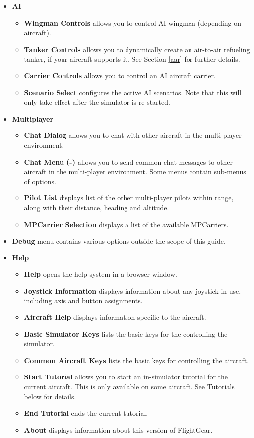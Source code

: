 \begin{itemize}
\item \textbf{AI}
 \begin{itemize}
  \item \textbf{Wingman Controls} allows you to control AI wingmen (depending on aircraft).
  \item \textbf{Tanker Controls}  allows you to dynamically create an air-to-air refueling
  tanker, if your aircraft supports it. See Section \ref{aar} for further details.
  \item \textbf{Carrier Controls} allows you to control an AI aircraft carrier.
  \item \textbf{Scenario Select}  configures the active AI scenarios.
  Note that this will only take effect after the simulator is re-started.
 \end{itemize}

\item \textbf{Multiplayer}
 \begin{itemize}
  \item \textbf{Chat Dialog} allows you to chat with other aircraft in
the multi-player environment.
  \item \textbf{Chat Menu (-)} allows you to send common chat messages to
  other aircraft in the multi-player environment. Some menus
  contain sub-menus of options.
  \item \textbf{Pilot List} displays list of the other multi-player pilots
  within range, along with their distance, heading and altitude.
  \item \textbf{MPCarrier Selection} displays a list of the available MPCarriers.
\end{itemize}

\item \textbf{Debug} menu contains various options
outside the scope of this guide.

 \item \textbf{Help}
 \begin{itemize}
 \item \textbf{Help} opens the help system in a browser window.
 \item \textbf{Joystick Information} displays information about any joystick
 in use, including axis and button assignments.
 \item \textbf{Aircraft Help} displays information specific to the aircraft.
 \item \textbf{Basic Simulator Keys} lists the basic keys for the controlling the
simulator.
 \item \textbf{Common Aircraft Keys} lists the basic keys for controlling the
aircraft.
 \item \textbf{Start Tutorial} allows you to start an in-simulator tutorial for
 the current aircraft.
 This is only available on some aircraft. See Tutorials below for details.
 \item \textbf{End Tutorial} ends the current tutorial.
 \item \textbf{About} displays information about this version of FlightGear.
 \end{itemize}
\end{itemize}

